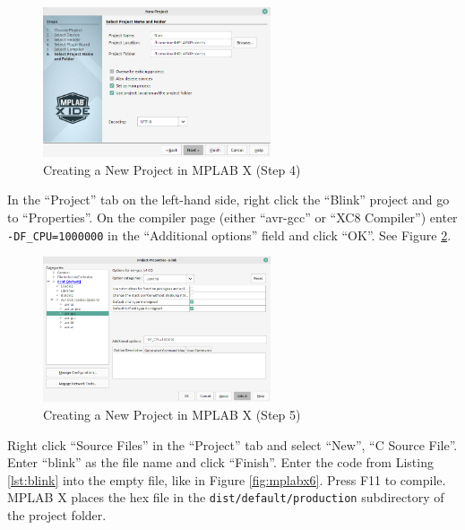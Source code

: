 \documentclass{article}
\newcommand{\file}[1]{\texttt{#1}}
\begin{document}
\begin{figure}[htb]
\centering
\includegraphics[width=0.6\textwidth]{Pictures/MPLABX4.png}
\caption{Creating a New Project in MPLAB X (Step 4)}
\label{fig:mplabx4}
\end{figure}

In the ``Project'' tab on the left-hand side, right click the ``Blink'' project and go to ``Properties''. On the compiler page (either ``avr-gcc'' or ``XC8 Compiler'') enter \texttt{-DF\_CPU=1000000} in the ``Additional options'' field and click ``OK''. See Figure \ref{fig:mplabx5}.  

\begin{figure}[htb]
\centering
\includegraphics[width=0.6\textwidth]{Pictures/MPLABX5.png}
\caption{Creating a New Project in MPLAB X (Step 5)}
\label{fig:mplabx5}
\end{figure}

Right click ``Source Files'' in the ``Project'' tab and select ``New'', ``C Source File''. Enter ``blink'' as the file name and click ``Finish''. Enter the code from Listing \ref{lst:blink} into the empty file, like in Figure \ref{fig:mplabx6}. Press F11 to compile. MPLAB X places the hex file in the \file{dist/default/production} subdirectory of the project folder. 
\end{document}
